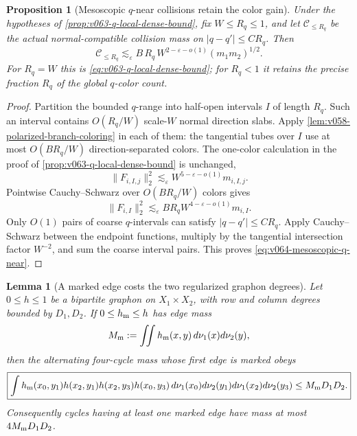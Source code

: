 \documentclass[10pt]{article}
\newtheorem{proposition}[theorem]{Proposition}
\newtheorem{lemma}[theorem]{Lemma}
\begin{document}
\begin{proposition}[Mesoscopic \(q\)-near collisions retain the color gain]
\label{prop:v064-mesoscopic-q-near}
Under the hypotheses of \cref{prop:v063-q-local-dense-bound}, fix
\(W\le R_q\le1\), and let \(\mathcal C_{\le R_q}\) be the actual normal-compatible collision mass
on \(|q-q'|\le C R_q\).  Then
\begin{equation}
\label{eq:v064-mesoscopic-q-near}
\boxed{
\mathcal C_{\le R_q}
\lesssim_\varepsilon
B\,R_q\,W^{2-\varepsilon-o(1)}
(m_1m_2)^{1/2}.
}
\end{equation}
For \(R_q=W\) this is \eqref{eq:v063-q-local-dense-bound}; for \(R_q<1\) it retains the precise
fraction \(R_q\) of the global \(q\)-color count.
\end{proposition}

\begin{proof}
Partition the bounded \(q\)-range into half-open intervals \(I\) of length \(R_q\).  Such an
interval contains \(O(R_q/W)\) scale-\(W\) normal direction slabs.  Apply
\cref{lem:v058-polarized-branch-coloring} in each of them: the tangential tubes over \(I\) use at
most \(O(BR_q/W)\) direction-separated colors.  The one-color calculation in the proof of
\cref{prop:v063-q-local-dense-bound} is unchanged,
\[
\|F_{i,I,j}\|_2^2
\lesssim_\varepsilon
W^{5-\varepsilon-o(1)}m_{i,I,j}.
\]
Pointwise Cauchy--Schwarz over \(O(BR_q/W)\) colors gives
\[
\|F_{i,I}\|_2^2
\lesssim_\varepsilon
B R_q W^{4-\varepsilon-o(1)}m_{i,I}.
\]
Only \(O(1)\) pairs of coarse \(q\)-intervals can satisfy \(|q-q'|\le C R_q\).  Apply
Cauchy--Schwarz between the endpoint functions, multiply by the tangential intersection factor
\(W^{-2}\), and sum the coarse interval pairs.  This proves
\eqref{eq:v064-mesoscopic-q-near}.
\end{proof}

\begin{lemma}[A marked edge costs the two regularized graphon degrees]
\label{lem:v064-marked-edge-four-cycle}
Let \(0\le h\le1\) be a bipartite graphon on \(X_1\times X_2\), with row and column degrees bounded
by \(D_1,D_2\).  If \(0\le h_{\rm m}\le h\) has edge mass
\[
M_{\rm m}
:=
\iint h_{\rm m}(x,y)\,d\nu_1(x)d\nu_2(y),
\]
then the alternating four-cycle mass whose first edge is marked obeys
\begin{equation}
\label{eq:v064-marked-edge-four-cycle}
\boxed{
\int
h_{\rm m}(x_0,y_1)
h(x_2,y_1)
h(x_2,y_3)
h(x_0,y_3)
\,d\nu_1(x_0)d\nu_2(y_1)d\nu_1(x_2)d\nu_2(y_3)
\le
M_{\rm m}D_1D_2.
}
\end{equation}
Consequently cycles having at least one marked edge have mass at most
\(4M_{\rm m}D_1D_2\).
\end{lemma}
\end{document}
